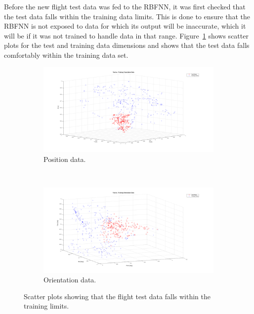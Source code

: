 Before the new flight test data was fed to the RBFNN, it was first checked that the test data falls within the training data limits. This is done to ensure that the RBFNN is not exposed to data for which its output will be inaccurate, which it will be if it was not trained to handle data in that range. Figure~\ref{fig:chap5-ts-tr-scatter} shows scatter plots for the test and training data dimensions and shows that the test data falls comfortably within the training data set. 

\begin{figure}
  \centering
  \begin{subfigure}{0.9\textwidth}
    \includegraphics[clip, trim = 120 40 120 0, width=\textwidth]{figures/chapter5/ts_v_tr_pos}
    \caption{Position data.}
  \end{subfigure}
  ~
  \begin{subfigure}{0.9\textwidth}
    \includegraphics[clip, trim = 120 40 120 0, width=\textwidth]{figures/chapter5/ts_v_tr_orient}
    \caption{Orientation data.}
  \end{subfigure}
  \caption[Scatter plots of flight data vs.\ training data. ]{Scatter plots showing that the flight test data falls within the training limits. }
  \label{fig:chap5-ts-tr-scatter}
\end{figure}

